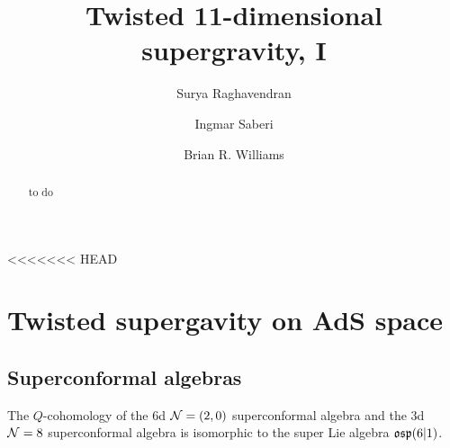 \documentclass[11pt]{amsart}
\begin{document}
\title{Twisted 11-dimensional supergravity, I}
\author{Surya Raghavendran}
\address{Perimeter Institute for Theoretical Physics \\ 31 Caroline Street North \\ 
Waterloo, Ontario N2L 2Y5\\ Canada}
\author{Ingmar Saberi}
\address{Ludwig-Maximilians-Universit\"at M\"unchen \\ Fakult\"at f\"ur Physik \\ Theresienstra\ss{}e 37 \\ 80333 M\"unchen \\ Deutschland}
\author{Brian R. Williams}
\address{School of Mathematics \\ University of Edinburgh \\ Edinburgh EH9 3FD \\ Scotland}
\begin{abstract}
to do
\end{abstract}
\maketitle
\newpage 








<<<<<<< HEAD

\section{Twisted supergavity on AdS space}

\subsection{Superconformal algebras}

\begin{prop}
The $Q$-cohomology of the 6d $\mathcal N=(2,0)$ superconformal algebra and the 3d $\mathcal N=8$ superconformal algebra is isomorphic to the super Lie algebra $\mathfrak{osp}(6|1)$. 
\end{prop} 
\end{document}
